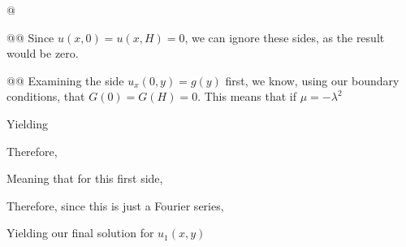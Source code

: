 \documentclass[10pt]{article}
\begin{document}
\begin{easylist}[enumerate]
    @ 

    @@ Since $u(x, 0) = u(x, H) = 0$, we can ignore these sides, as the result would be zero.

    @@ Examining the side $u_x(0, y) = g(y)$ first, we know, using our boundary conditions, that $G(0) = G(H) = 0$. This
    means that if $\mu = -\lambda^2$


    Yielding


    Therefore,


    Meaning that for this first side,


    Therefore, since this is just a Fourier series,


    Yielding our final solution for $u_1(x, y)$



\end{easylist}
\end{document}

